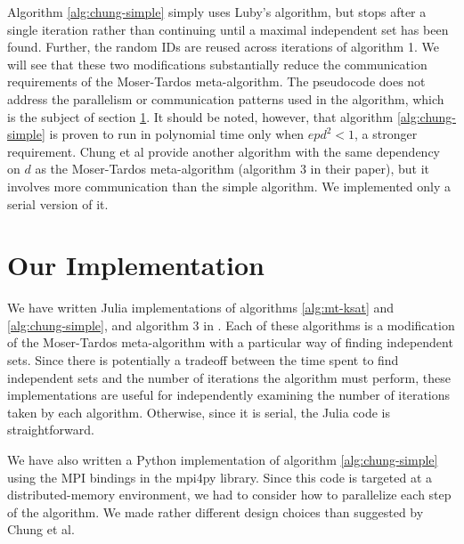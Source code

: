 \documentclass[twocolumn]{article}
\newcommand{\ksat}{\texttt{k-SAT}~}
\begin{document}
Algorithm \ref{alg:chung-simple} simply uses Luby's algorithm, but stops after a single iteration rather than continuing until a maximal independent set has been found.  Further, the random IDs are reused across iterations of algorithm 1.  We will see that these two modifications substantially reduce the communication requirements of the Moser-Tardos meta-algorithm.  The pseudocode does not address the parallelism or communication patterns used in the algorithm, which is the subject of section \ref{sec:implementation}.  It should be noted, however, that algorithm \ref{alg:chung-simple} is proven to run in polynomial time only when $e p d^2 < 1$, a stronger requirement.  Chung et al provide another algorithm with the same dependency on $d$ as the Moser-Tardos meta-algorithm (algorithm 3 in their paper), but it involves more communication than the simple algorithm.  We implemented only a serial version of it.


\section{Our Implementation}
\label{sec:implementation}
We have written Julia implementations of algorithms \ref{alg:mt-ksat} and \ref{alg:chung-simple}, and algorithm 3 in \cite{chung2014distributed}.  Each of these algorithms is a modification of the Moser-Tardos meta-algorithm with a particular way of finding independent sets.  Since there is potentially a tradeoff between the time spent to find independent sets and the number of iterations the algorithm must perform, these implementations are useful for independently examining the number of iterations taken by each algorithm.  Otherwise, since it is serial, the Julia code is straightforward. 

We have also written a Python implementation of algorithm \ref{alg:chung-simple} using the MPI bindings in the mpi4py library.  Since this code is targeted at a distributed-memory environment, we had to consider how to parallelize each step of the algorithm.  We made rather different design choices than suggested by Chung et al.
\end{document}
